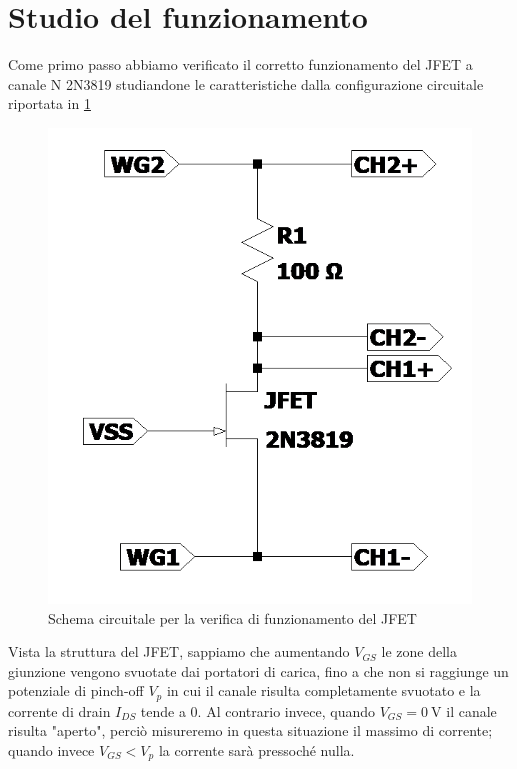 \documentclass[10pt, a4paper, italian]{article}
\begin{document}
\section{Studio del funzionamento}
Come primo passo abbiamo verificato il corretto funzionamento del JFET a canale
N 2N3819 studiandone le caratteristiche dalla configurazione circuitale
riportata in \ref{schm: tracer}
\begin{figure}[htbp]
    \centering
	\includegraphics[scale=0.5]{Draft1}
    \caption{Schema circuitale per la verifica di funzionamento del JFET
    \label{schm: tracer}}
\end{figure}

Vista la struttura del JFET, sappiamo che aumentando $V_{GS}$ le zone della giunzione vengono svuotate dai portatori di carica, fino a che non si raggiunge un potenziale di pinch-off $V_p$ in cui il canale risulta completamente svuotato e la corrente di drain $I_{DS}$ tende a 0. Al contrario invece, quando $V_{GS} = \SI{0}{\V}$ il canale risulta "aperto", perciò misureremo in questa situazione il massimo di corrente; quando invece $V_{GS} < V_p$ la corrente sarà pressoché nulla.
\end{document}
